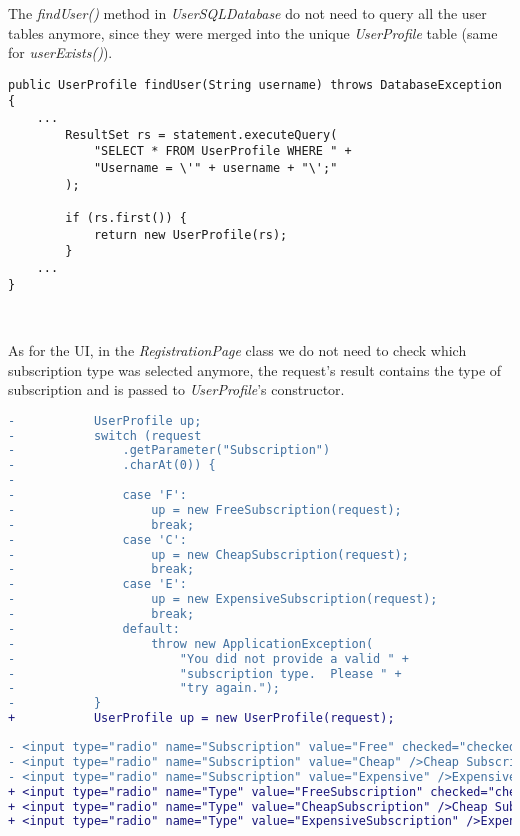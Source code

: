 The \emph{findUser()} method in \emph{UserSQLDatabase} do not need to
query all the user tables anymore, since they were merged into the
unique \emph{UserProfile} table (same for \emph{userExists()}).\\

\begin{lstlisting}
public UserProfile findUser(String username) throws DatabaseException {
    ...
        ResultSet rs = statement.executeQuery(
            "SELECT * FROM UserProfile WHERE " +
            "Username = \'" + username + "\';"
        );
        
        if (rs.first()) {
            return new UserProfile(rs);
        }
    ...
}
\end{lstlisting}
\

As for the UI, in the \emph{RegistrationPage} class we do not need to
check which subscription type was selected anymore, the request's result
contains the type of subscription and is passed to \emph{UserProfile}'s
constructor.\\

\begin{lstlisting}[language=diff, caption={RegistrationPage diff}]
-           UserProfile up;
-           switch (request
-               .getParameter("Subscription")
-               .charAt(0)) {
-
-               case 'F':
-                   up = new FreeSubscription(request);
-                   break;
-               case 'C':
-                   up = new CheapSubscription(request);
-                   break;
-               case 'E':
-                   up = new ExpensiveSubscription(request);
-                   break;
-               default:
-                   throw new ApplicationException(
-                       "You did not provide a valid " +
-                       "subscription type.  Please " +
-                       "try again.");
-           }
+           UserProfile up = new UserProfile(request);
\end{lstlisting}

\begin{lstlisting}[language=diff, caption={web\_portal.xsl diff}]
- <input type="radio" name="Subscription" value="Free" checked="checked" />Free Subscription<br />
- <input type="radio" name="Subscription" value="Cheap" />Cheap Subscription<br />
- <input type="radio" name="Subscription" value="Expensive" />Expensive Subscription<br />
+ <input type="radio" name="Type" value="FreeSubscription" checked="checked" />Free Subscription<br />
+ <input type="radio" name="Type" value="CheapSubscription" />Cheap Subscription<br />
+ <input type="radio" name="Type" value="ExpensiveSubscription" />Expensive Subscription<br />
\end{lstlisting}

\newpage
